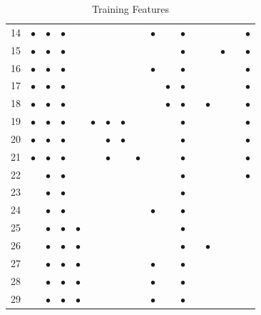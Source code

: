 \begin{landscape}
\begin{table}
\begin{center}
\begin{tabular}{|c|c|c|c|c|c|c|c|c|c|c|c|c|c|c|c|c|}
        14 & $\bullet$ & $\bullet$ & $\bullet$ & & & & & & $\bullet$ & & $\bullet$ & & & & & $\bullet$ \\
        15\footnotemark[1] & $\bullet$ & $\bullet$ & $\bullet$ & & & & & & & & $\bullet$ & & & $\bullet$ & & $\bullet$ \\ %
        16\footnotemark[2] & $\bullet$ & $\bullet$ & $\bullet$ & & & & & & $\bullet$ & & $\bullet$ & & & & & $\bullet$ \\ %
        17\footnotemark[3] & $\bullet$ & $\bullet$ & $\bullet$ & & & & & & & $\bullet$ & $\bullet$ & & & & & $\bullet$ \\ %
        18\footnotemark[1]\footnotemark[3] & $\bullet$ & $\bullet$ & $\bullet$ & & & & & & & $\bullet$ & $\bullet$ & & $\bullet$ & & & $\bullet$ \\ %
        19 & $\bullet$ & $\bullet$ & $\bullet$ & & $\bullet$ & $\bullet$ & $\bullet$ & & & & $\bullet$ & & & & & $\bullet$ \\
        20 & $\bullet$ & $\bullet$ & $\bullet$ & & & $\bullet$ & $\bullet$ & & & & $\bullet$ & & & & & $\bullet$ \\
        21 & $\bullet$ & $\bullet$ & $\bullet$ & & & $\bullet$ & & $\bullet$ & & & $\bullet$ & & & & & $\bullet$ \\
        22 & & $\bullet$ & $\bullet$ & & & & & & & & $\bullet$ & & & & & $\bullet$ \\
        23 & & $\bullet$ & $\bullet$ & & & & & & & & $\bullet$ & & & & & \\
        24 & & $\bullet$ & $\bullet$ & & & & & & $\bullet$ & & $\bullet$ & & & & & \\
        25 & & $\bullet$ & $\bullet$ & $\bullet$ & & & & & & & $\bullet$ & & & & & \\
        26 & & $\bullet$ & $\bullet$ & $\bullet$ & & & & & & & $\bullet$ & & $\bullet$ & & & \\
        27\footnotemark[2] & & $\bullet$ & $\bullet$ & $\bullet$ & & & & & $\bullet$ & & $\bullet$ & & & & & \\ %
        28 & & $\bullet$ & $\bullet$ & $\bullet$ & & & & & $\bullet$ & & $\bullet$ & & & & & \\
        29\footnotemark[4] & & $\bullet$ & $\bullet$ & $\bullet$ & & & & & $\bullet$ & & $\bullet$ & & & & & \\ %
        \hline
    \end{tabular}
    \caption{Training Features}
    \label{tab:training_features}
\end{center}
\end{table}
\restoregeometry
\end{landscape}
\thispagestyle{plain}

